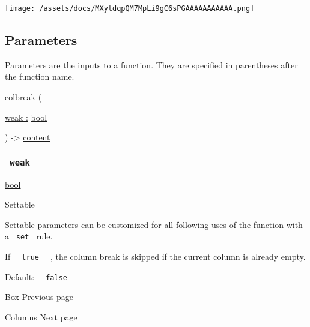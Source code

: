 \texttt{[image: /assets/docs/MXyldqpQM7MpLi9gC6sPGAAAAAAAAAAA.png]}

\subsection{\texorpdfstring{{ Parameters
}}{ Parameters }}\label{parameters}

\label{parameters-tooltip}
Parameters are the inputs to a function. They are specified in
parentheses after the function name.

{ colbreak } (

{ \hyperref[parameters-weak]{weak :}
\href{/docs/reference/foundations/bool/}{bool} }

) -\textgreater{} \href{/docs/reference/foundations/content/}{content}

\subsubsection{\texorpdfstring{\texttt{\ weak\ }}{ weak }}\label{parameters-weak}

\href{/docs/reference/foundations/bool/}{bool}

{{ Settable }}

\label{parameters-weak-settable-tooltip}
Settable parameters can be customized for all following uses of the
function with a \texttt{\ set\ } rule.

If \texttt{\ }{\texttt{\ true\ }}\texttt{\ } , the column break is
skipped if the current column is already empty.

Default: \texttt{\ }{\texttt{\ false\ }}\texttt{\ }

\href{/docs/reference/layout/box/}{\pandocbounded{}}

{ Box } { Previous page }

\href{/docs/reference/layout/columns/}{\pandocbounded{}}

{ Columns } { Next page }

